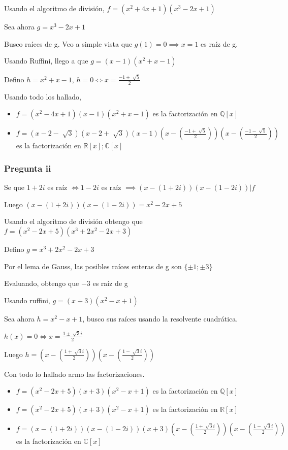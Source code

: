 Usando el algoritmo de división, $ f = (x^2 + 4x + 1)(x^3-2x+1) $

Sea ahora $ g = x^3-2x+1 $

Busco raíces de g. Veo a simple vista que $ g(1) = 0 \implies x = 1 $ es raíz de g.

Usando Ruffini, llego a que $ g = (x-1)(x^2+x-1) $

Defino $ h = x^2+x-1 $, $ h = 0 \iff x = \frac{-1 \pm \sqrt[]{5}}{2} $

Usando todo los hallado,
\begin{itemize}
    \item $ f = (x^2 -4x + 1)(x-1)(x^2 +x -1) $ es la factorización en $ \mathbb{Q}[x] $
    \item $ f = (x-2-\sqrt[]{3})(x-2+\sqrt[]{3})(x-1)(x-(\frac{-1+\sqrt[]{5}}{2}))(x-(\frac{-1-\sqrt[]{5}}{2})) $ es la factorización en $ \mathbb{R}[x]; \mathbb{C}[x] $
\end{itemize}

\subsubsection{Pregunta ii}

Se que $ 1+2i $ es raíz $ \iff 1-2i $ es raíz $ \implies (x-(1+2i))(x-(1-2i)) | f $

Luego $ (x-(1+2i))(x-(1-2i)) = x^2 - 2x+5 $

Usando el algoritmo de división obtengo que $ f = (x^2 - 2x+5)(x^3+2x^2-2x+3) $

Defino $ g = x^3+2x^2-2x+3 $

Por el lema de Gauss, las posibles raíces enteras de g son $  \{ \pm 1; \pm 3 \}$

Evaluando, obtengo que $-3$ es raíz de g

Usando ruffini, $ g = (x+3)(x^2-x+1) $

Sea ahora $ h = x^2-x+1 $, busco sus raíces usando la resolvente cuadrática.

$ h(x) = 0 \iff x = \frac{1 \pm \sqrt[]{3}i}{2} $

Luego $ h = (x-(\frac{1 + \sqrt[]{3}i}{2}))(x-(\frac{1 - \sqrt[]{3}i}{2})) $ 

Con todo lo hallado armo las factorizaciones.

\begin{itemize}
    \item $ f = (x^2-2x+5)(x+3)(x^2-x+1) $ es la factorización en $ \mathbb{Q}[x] $
    \item $ f = (x^2-2x+5)(x+3)(x^2-x+1) $ es la factorización en $ \mathbb{R}[x] $
    \item $ f = (x-(1+2i))(x-(1-2i))(x+3)(x-(\frac{1 + \sqrt[]{3}i}{2}))(x-(\frac{1 - \sqrt[]{3}i}{2})) $ es la factorización en $ \mathbb{C}[x] $
\end{itemize}

